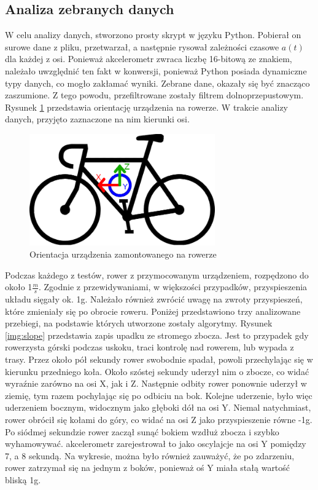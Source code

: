 \subsection{Analiza zebranych danych }
\label{sec:data_analysis}
W celu analizy danych, stworzono prosty skrypt w języku Python. Pobierał on surowe dane z pliku, przetwarzał, a następnie rysował zależności czasowe $a(t)$ dla każdej z osi. Ponieważ akcelerometr zwraca liczbę 16-bitową ze znakiem, należało uwzględnić ten fakt w konwersji, ponieważ Python posiada dynamiczne typy danych, co mogło zakłamać wyniki. Zebrane dane, okazały się być znacząco zaszumione. Z tego powodu, przefiltrowane zostały filtrem dolnoprzepustowym. Rysunek \ref{img:bike} przedstawia orientację urządzenia na rowerze. W trakcie analizy danych, przyjęto zaznaczone na nim kierunki osi.
\begin{figure}[hb]
    \centering
    \includegraphics[width=8cm]{Graphics/rowerek.png}
    \caption{Orientacja urządzenia zamontowanego na rowerze}
    \label{img:bike}
\end{figure}
Podczas każdego z testów, rower z przymocowanym urządzeniem, rozpędzono do około 1$\frac{m}{s}$. Zgodnie z przewidywaniami, w większości przypadków, przyspieszenia układu sięgały ok. 1g. Należało również zwrócić uwagę na zwroty przyspieszeń, które zmieniały się po obrocie roweru. Poniżej przedstawiono trzy analizowane przebiegi, na podstawie których utworzone zostały algorytmy. 
\newline
\newline
Rysunek \ref{img:slope} przedstawia zapis upadku ze stromego zbocza. Jest to przypadek gdy rowerzysta górski podczas uskoku, traci kontrolę nad rowerem, lub wypada z trasy. Przez około pół sekundy rower swobodnie spadał, powoli przechylając się w kierunku przedniego koła. Około szóstej sekundy uderzył nim o zbocze, co widać wyraźnie zarówno na osi X, jak i Z. Następnie odbity rower ponownie uderzył w ziemię, tym razem pochylając się po odbiciu na bok. Kolejne uderzenie, było więc uderzeniem bocznym, widocznym jako głęboki dół  na osi Y. Niemal natychmiast, rower obrócił się kołami do góry, co widać na osi Z jako przyspieszenie równe -1g. Po siódmej sekundzie rower zaczął sunąć bokiem wzdłuż zbocza i szybko wyhamowywać. akcelerometr zarejestrował to jako oscylajcje na osi Y pomiędzy 7, a 8 sekundą. Na wykresie, można było również zauważyć, że po zdarzeniu, rower zatrzymał się na jednym z boków, ponieważ oś Y miała stałą wartość bliską 1g.
